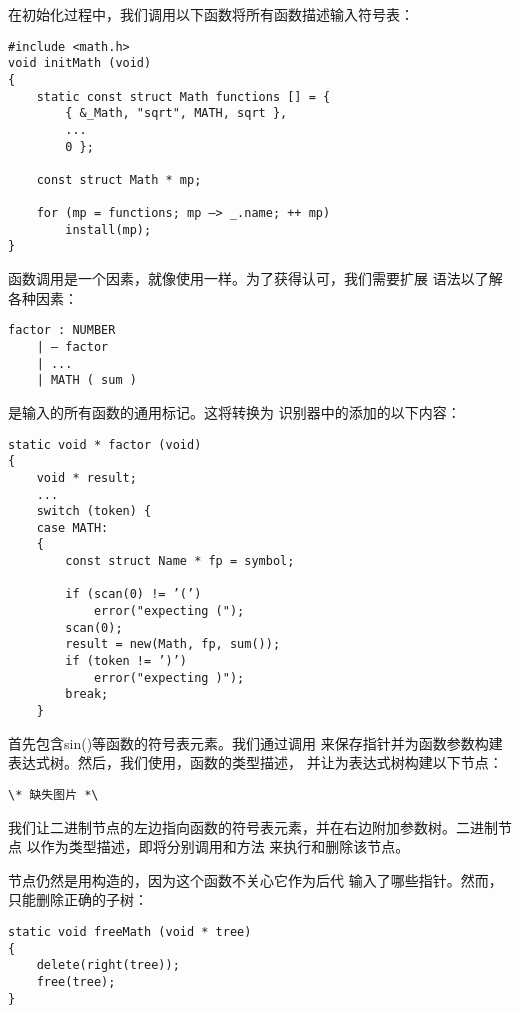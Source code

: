 在初始化过程中，我们调用以下函数将所有函数描述输入符号表：

\begin{lstlisting}
#include <math.h> 
void initMath (void) 
{ 
    static const struct Math functions [] = { 
        { &_Math, "sqrt", MATH, sqrt }, 
        ... 
        0 };
        
    const struct Math * mp;
    
    for (mp = functions; mp —> _.name; ++ mp)
        install(mp);
} 
\end{lstlisting}

    函数调用是一个因素，就像使用一样。为了获得认可，我们需要扩展
语法以了解各种因素：

\begin{lstlisting}
factor : NUMBER 
    | — factor 
    | ... 
    | MATH ( sum ) 
\end{lstlisting}

    是输入的所有函数的通用标记。这将转换为
识别器中的添加的以下内容：

\begin{lstlisting}
static void * factor (void) 
{
    void * result;
    ...
    switch (token) { 
    case MATH:
    {
        const struct Name * fp = symbol;
        
        if (scan(0) != ’(’)
            error("expecting (");
        scan(0);
        result = new(Math, fp, sum());
        if (token != ’)’)
            error("expecting )");
        break;
    } 
\end{lstlisting}

    首先包含sin()等函数的符号表元素。我们通过调用
来保存指针并为函数参数构建表达式树。然后，我们使用，函数的类型描述，
并让为表达式树构建以下节点：

\begin{lstlisting}
\* 缺失图片 *\
\end{lstlisting}

    我们让二进制节点的左边指向函数的符号表元素，并在右边附加参数树。二进制节点
以作为类型描述，即将分别调用和方法
来执行和删除该节点。


    节点仍然是用构造的，因为这个函数不关心它作为后代
输入了哪些指针。然而，\ccode{FreeMath()}只能删除正确的子树：

\begin{lstlisting}
static void freeMath (void * tree)
{
    delete(right(tree));
    free(tree);
} 
\end{lstlisting}

